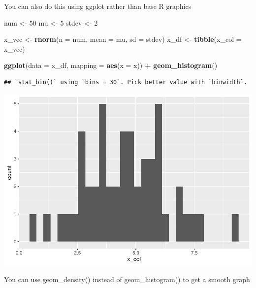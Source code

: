 \documentclass[
]{book}
\newenvironment{Shaded}{\begin{snugshade}}{\end{snugshade}}
\newcommand{\DataTypeTok}[1]{\textcolor[rgb]{0.13,0.29,0.53}{#1}}
\newcommand{\DecValTok}[1]{\textcolor[rgb]{0.00,0.00,0.81}{#1}}
\newcommand{\KeywordTok}[1]{\textcolor[rgb]{0.13,0.29,0.53}{\textbf{#1}}}
\newcommand{\NormalTok}[1]{#1}
\newcommand{\OperatorTok}[1]{\textcolor[rgb]{0.81,0.36,0.00}{\textbf{#1}}}
\newcommand{\StringTok}[1]{\textcolor[rgb]{0.31,0.60,0.02}{#1}}
\begin{document}
You can also do this using ggplot rather than base R graphics

\begin{Shaded}
\begin{Highlighting}[]
\NormalTok{num \textless{}{-}}\StringTok{ }\DecValTok{50}
\NormalTok{mu \textless{}{-}}\StringTok{ }\DecValTok{5}
\NormalTok{stdev \textless{}{-}}\StringTok{ }\DecValTok{2}

\NormalTok{x\_vec \textless{}{-}}\StringTok{ }\KeywordTok{rnorm}\NormalTok{(}\DataTypeTok{n =}\NormalTok{ num, }\DataTypeTok{mean =}\NormalTok{ mu, }\DataTypeTok{sd =}\NormalTok{ stdev)}
\NormalTok{x\_df \textless{}{-}}\StringTok{ }\KeywordTok{tibble}\NormalTok{(}\DataTypeTok{x\_col =}\NormalTok{ x\_vec)}

\KeywordTok{ggplot}\NormalTok{(}\DataTypeTok{data =}\NormalTok{ x\_df, }\DataTypeTok{mapping =} \KeywordTok{aes}\NormalTok{(}\DataTypeTok{x =}\NormalTok{ x)) }\OperatorTok{+}
\StringTok{  }\KeywordTok{geom\_histogram}\NormalTok{()}
\end{Highlighting}
\end{Shaded}

\begin{verbatim}
## `stat_bin()` using `bins = 30`. Pick better value with `binwidth`.
\end{verbatim}

\includegraphics{test_course_notes_files/figure-latex/ggplot-hist-1.pdf}

You can use geom\_density() instead of geom\_histogram() to get a smooth graph
\end{document}
